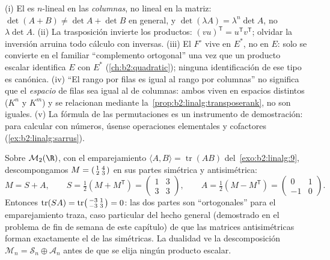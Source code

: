 \begin{remark}\label{rem:b2:linalg:pitfalls}
(i) El  es $n$-lineal en las \emph{columnas}, no lineal
en la matriz: $\det(A + B) \neq \det A + \det B$ en general, y
$\det(\lambda A) = \lambda^n\det A$, no $\lambda\det A$. (ii) La
trasposición invierte los productos: $(vu)^{\mathsf T} =
u^{\mathsf T}v^{\mathsf T}$; olvidar la inversión arruina todo
cálculo con inversas. (iii) El  $F^\circ$ vive en $E^*$,
no en $E$: solo se convierte en el familiar ``complemento
ortogonal'' una vez que un producto escalar identifica $E$ con $E^*$
(\cref{ch:b2:quadratic}); ninguna identificación de ese tipo es
canónica. (iv) ``El rango por filas es igual al rango por columnas''
no significa que el \emph{espacio} de filas sea igual al de
columnas: ambos viven en espacios distintos ($K^n$ y $K^m$) y se
relacionan mediante la~\cref{prop:b2:linalg:transposerank}, no son
iguales. (v) La fórmula de las permutaciones es un instrumento de
demostración: para calcular con números, úsense operaciones
elementales y cofactores (\cref{ex:b2:linalg:sarrus}).
\end{remark}

\begin{example}\label{ex:b2:linalg:tracepairing}
Sobre $\mathcal{M}_2(\R)$, con el emparejamiento $\langle A,
B\rangle = \operatorname{tr}(AB)$ del~\cref{exo:b2:linalg:9},
descompongamos $M = \begin{psmallmatrix}1 & 4\\ 2 &
3\end{psmallmatrix}$ en sus partes simétrica y antisimétrica:
\[
M = S + A, \qquad
S = \tfrac12(M + M^{\mathsf T}) =
\begin{pmatrix}1 & 3\\ 3 & 3\end{pmatrix},
\qquad
A = \tfrac12(M - M^{\mathsf T}) =
\begin{pmatrix}0 & 1\\ -1 & 0\end{pmatrix}.
\]
Entonces $\operatorname{tr}(SA) = \operatorname{tr}
\begin{psmallmatrix}-3 & 1\\ -3 & 3\end{psmallmatrix} = 0$: las dos
partes son ``ortogonales'' para el emparejamiento traza, caso
particular del hecho general (demostrado en el problema de fin de
semana de este capítulo) de que las matrices antisimétricas forman
exactamente el  de las simétricas. La dualidad ve la
descomposición $\mathcal{M}_n = \mathcal{S}_n \oplus \mathcal{A}_n$
antes de que se elija ningún producto escalar.
\end{example}

